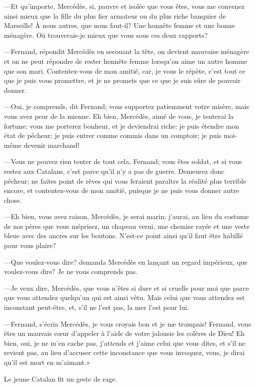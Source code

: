 —Et qu'importe, Mercédès, si, pauvre et isolée que vous êtes, vous me convenez ainsi mieux que la fille du plus fier armateur ou du plus riche banquier de Marseille! À nous autres, que nous faut-il? Une honnête femme et une bonne ménagère. Où trouverais-je mieux que vous sous ces deux rapports?

—Fernand, répondit Mercédès en secouant la tête, on devient mauvaise ménagère et on ne peut répondre de rester honnête femme lorsqu'on aime un autre homme que son mari. Contentez-vous de mon amitié, car, je vous le répète, c'est tout ce que je puis vous promettre, et je ne promets que ce que je suis sûre de pouvoir donner.

—Oui, je comprends, dit Fernand; vous supportez patiemment votre misère, mais vous avez peur de la mienne. Eh bien, Mercédès, aimé de vous, je tenterai la fortune; vous me porterez bonheur, et je deviendrai riche: je puis étendre mon état de pêcheur; je puis entrer comme commis dans un comptoir; je puis moi-même devenir marchand!

—Vous ne pouvez rien tenter de tout cela, Fernand; vous êtes soldat, et si vous restez aux Catalans, c'est parce qu'il n'y a pas de guerre. Demeurez donc pêcheur; ne faites point de rêves qui vous feraient paraître la réalité plus terrible encore, et contentez-vous de mon amitié, puisque je ne puis vous donner autre chose.

—Eh bien, vous avez raison, Mercédès, je serai marin; j'aurai, au lieu du costume de nos pères que vous méprisez, un chapeau verni, une chemise rayée et une veste bleue avec des ancres sur les boutons. N'est-ce point ainsi qu'il faut être habillé pour vous plaire?

—Que voulez-vous dire? demanda Mercédès en lançant un regard impérieux, que voulez-vous dire? Je ne vous comprends pas.

—Je veux dire, Mercédès, que vous n'êtes si dure et si cruelle pour moi que parce que vous attendez quelqu'un qui est ainsi vêtu. Mais celui que vous attendez est inconstant peut-être, et, s'il ne l'est pas, la mer l'est pour lui.

—Fernand, s'écria Mercédès, je vous croyais bon et je me trompais! Fernand, vous êtes un mauvais cœur d'appeler à l'aide de votre jalousie les colères de Dieu! Eh bien, oui, je ne m'en cache pas, j'attends et j'aime celui que vous dites, et s'il ne revient pas, au lieu d'accuser cette inconstance que vous invoquez, vous, je dirai qu'il est mort en m'aimant.»

Le jeune Catalan fit un geste de rage.

